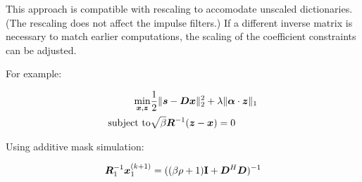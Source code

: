 \documentclass{article}
\begin{document}
This approach is compatible with rescaling to accomodate unscaled dictionaries.  (The rescaling does not affect the impulse filters.) If a different inverse matrix is necessary to match earlier computations, the scaling of the coefficient constraints can be adjusted.

For example:

\begin{equation}
\begin{aligned}
\min_{\bm{x},\bm{z}} & \frac{1}{2}\|\bm{s} - \bm{D}\bm{x}\|_2^2 + \lambda \|\bm{\alpha} \cdot \bm{z} \|_1 \\
\text{subject to} & \sqrt{\beta} \bm{R}^{-1}(\bm{z} - \bm{x}) = 0
\end{aligned}
\end{equation}

Using additive mask simulation:

\begin{equation}
\bm{R}_1^{-1}\bm{x}_1^{(k + 1)} = ((\beta\rho + 1){\bf I} + \bm{D}^H\bm{D})^{-1}
\end{equation}
\end{document}
